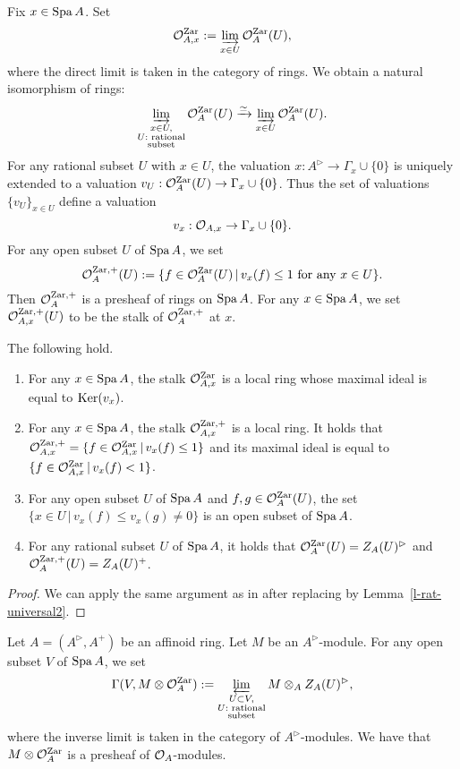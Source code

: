 Fix $x \in {\operatorname{Spa}}\,A$. 
Set 
$$\mathcal{O}^{{\operatorname{Zar}}}_{A, x}:=\varinjlim_{x \in U} \mathcal{O}^{{\operatorname{Zar}}}_A(U),$$ 
where the direct limit is taken in the category of rings. 
We obtain a natural isomorphism of rings: 
$$\varinjlim_{\substack{x \in U,\\ 
U:\text{ rational}\\ 
\text{subset}}} \mathcal{O}^{{\operatorname{Zar}}}_A(U) \xrightarrow{\simeq} 
\varinjlim_{x \in U} \mathcal{O}^{{\operatorname{Zar}}}_A(U).$$
For any rational subset $U$ with $x \in U$, 
the valuation $x:A^{\rhd} \to \Gamma_x \cup \{0\}$ 
is uniquely extended to a valuation $v_U:\mathcal{O}_A^{{\operatorname{Zar}}}(U) \to \Gamma_x \cup \{0\}$. 
Thus the set of valuations $\{v_U\}_{x \in U}$ define a valuation 
$$v_x:\mathcal{O}_{A, x} \to \Gamma_x \cup \{0\}.$$
For any open subset $U$ of ${\operatorname{Spa}}\,A$, we set 
$$\mathcal{O}_A^{{\operatorname{Zar}}, +}(U):=\{f \in \mathcal{O}^{{\operatorname{Zar}}}_A(U)\,|\,v_x(f) \leq 1\text{ for any }x \in U\}.$$
Then $\mathcal{O}_A^{{\operatorname{Zar}}, +}$ is a presheaf of rings on ${\operatorname{Spa}}\,A$. 
For any $x \in {\operatorname{Spa}}\,A$, 
we set $\mathcal{O}_{A, x}^{{\operatorname{Zar}}, +}(U)$ to be the stalk of $\mathcal{O}_A^{{\operatorname{Zar}}, +}$ at $x$. 


\begin{prop}\label{p-zar-LRS}
The following hold. 
\begin{enumerate}
\item 
For any $x \in {\operatorname{Spa}}\,A$, 
the stalk $\mathcal{O}_{A, x}^{{\operatorname{Zar}}}$ is a local ring 
whose maximal ideal is equal to ${\operatorname{Ker}}(v_x)$. 
\item 
For any $x \in {\operatorname{Spa}}\,A$, 
the stalk $\mathcal{O}_{A, x}^{{\operatorname{Zar}}, +}$ is a local ring. 
It holds that 
$\mathcal{O}_{A, x}^{{\operatorname{Zar}}, +}=\{f \in \mathcal{O}_{A, x}^{{\operatorname{Zar}}}\,|\, v_x(f) \leq 1\}$ and 
its maximal ideal is equal to $\{f \in \mathcal{O}_{A, x}^{{\operatorname{Zar}}}\,|\, v_x(f) < 1\}$. 
\item 
For any open subset $U$ of ${\operatorname{Spa}}\,A$ and $f, g \in \mathcal{O}_A^{{\operatorname{Zar}}}(U)$, 
the set $\{x \in U\,|\,v_x(f) \leq v_x(g) \neq 0\}$ is 
an open subset of ${\operatorname{Spa}}\,A$. 
\item 
 For any rational subset $U$ of ${\operatorname{Spa}}\,A$, 
 it holds that $\mathcal{O}_A^{{\operatorname{Zar}}}(U)=Z_A(U)^{\rhd}$ and 
$\mathcal{O}_A^{{\operatorname{Zar}}, +}(U)=Z_A(U)^+$. 
\end{enumerate}
\end{prop}

\begin{proof}
We can apply the same argument as in \cite[Proposition 1.6]{Hub94} 
after replacing \cite[Lemma 1.5]{Hub94} by Lemma~\ref{l-rat-universal2}. 
\end{proof}


Let $A=(A^{\rhd}, A^+)$ be an affinoid ring. 
Let $M$ be an $A^{\rhd}$-module. 
For any open subset $V$ of ${\operatorname{Spa}}\,A$, we set 
$$\Gamma(V, M \otimes \mathcal{O}_A^{{\operatorname{Zar}}}):=
\varprojlim_{\substack{U \subset V,\\ 
U:\text{ rational}\\ 
\text{subset}}}M \otimes_A Z_A(U)^{\rhd},$$
where the inverse limit is taken in the category of $A^{\rhd}$-modules. 
We have that $M \otimes \mathcal{O}_A^{{\operatorname{Zar}}}$ is a presheaf of $\mathcal{O}_A$-modules. 



